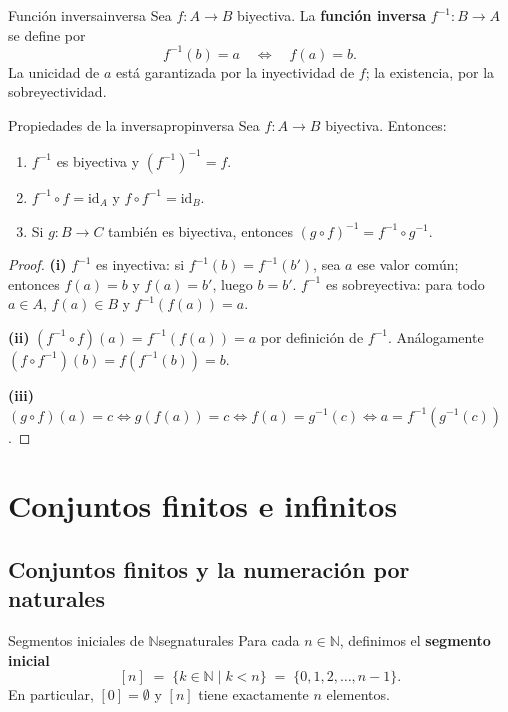 \begin{definicion}{Función inversa}{inversa}
Sea $f: A \to B$ biyectiva. La \textbf{función inversa} $f^{-1}: B \to A$ se define por
\[
  f^{-1}(b) = a \quad \iff \quad f(a) = b.
\]
La unicidad de $a$ está garantizada por la inyectividad de $f$; la existencia, por la sobreyectividad.
\end{definicion}

\begin{proposicion}{Propiedades de la inversa}{propinversa}
Sea $f: A \to B$ biyectiva. Entonces:
\begin{enumerate}[leftmargin=2em, label=(\roman*)]
  \item $f^{-1}$ es biyectiva y $(f^{-1})^{-1} = f$.
  \item $f^{-1} \circ f = \mathrm{id}_A$ y $f \circ f^{-1} = \mathrm{id}_B$.
  \item Si $g: B \to C$ también es biyectiva, entonces $(g \circ f)^{-1} = f^{-1} \circ g^{-1}$.
\end{enumerate}
\end{proposicion}

\begin{proof}
\textbf{(i)} $f^{-1}$ es inyectiva: si $f^{-1}(b) = f^{-1}(b')$, sea $a$ ese valor común; entonces $f(a) = b$ y $f(a) = b'$, luego $b = b'$. $f^{-1}$ es sobreyectiva: para todo $a \in A$, $f(a) \in B$ y $f^{-1}(f(a)) = a$.

\textbf{(ii)} $(f^{-1} \circ f)(a) = f^{-1}(f(a)) = a$ por definición de $f^{-1}$. Análogamente $(f \circ f^{-1})(b) = f(f^{-1}(b)) = b$.

\textbf{(iii)} $(g \circ f)(a) = c \iff g(f(a)) = c \iff f(a) = g^{-1}(c) \iff a = f^{-1}(g^{-1}(c))$.
\end{proof}

\section{Conjuntos finitos e infinitos}

\subsection{Conjuntos finitos y la numeración por naturales}

\begin{definicion}{Segmentos iniciales de $\mathbb{N}$}{segnaturales}
Para cada $n \in \mathbb{N}$, definimos el \textbf{segmento inicial}
\[
  [n] \;=\; \{k \in \mathbb{N} \mid k < n\} \;=\; \{0, 1, 2, \ldots, n-1\}.
\]
En particular, $[0] = \emptyset$ y $[n]$ tiene exactamente $n$ elementos.
\end{definicion}

